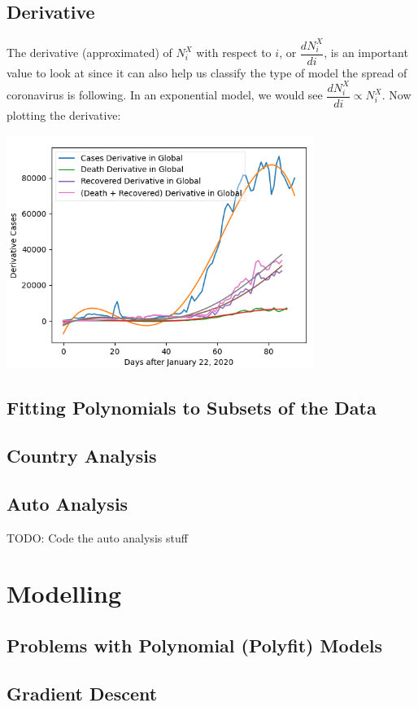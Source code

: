 \documentclass{report}
\begin{document}
        \subsection{Derivative}
            The derivative (approximated) of $N^X_i$ with respect to $i$, or $\dfrac{dN^X_i}{di}$, is an important value to look at since it can also help us classify the type of model the spread of coronavirus is following. In an exponential model, we would see $\dfrac{dN^X_i}{di} \propto N^X_i$. Now plotting the derivative:
            \begin{center}
                \includegraphics[width=10cm]{plots/global/derivative.png}
            \end{center}
        \subsection{Fitting Polynomials to Subsets of the Data}
        \subsection{Country Analysis}
        \subsection{Auto Analysis}
            TODO: Code the auto analysis stuff
    \section{Modelling}
        \subsection{Problems with Polynomial (Polyfit) Models}
        \subsection{Gradient Descent}
\end{document}
